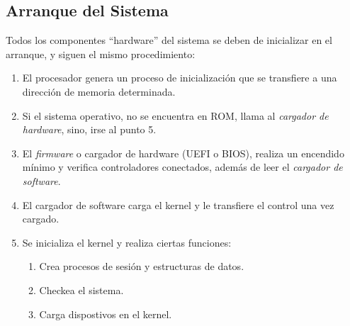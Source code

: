 \subsection{Arranque del Sistema}
Todos los componentes ``hardware'' del sistema se deben de inicializar en el arranque, y siguen el mismo procedimiento:
\begin{enumerate}
        \item El procesador genera un proceso de inicialización que se transfiere a una dirección de memoria determinada.
        \item Si el sistema operativo, no se encuentra en ROM, llama al \textit{cargador de hardware}, sino, irse al punto 5.
        \item El \textit{firmware} o cargador de hardware (UEFI o BIOS), realiza un encendido mínimo y verifica controladores conectados, además de leer el \textit{cargador de software}.
        \item El cargador de software carga el kernel y le transfiere el control una vez cargado.
        \item Se inicializa el kernel y realiza ciertas funciones:
              \begin{enumerate}
                      \item Crea procesos de sesión y estructuras de datos.
                      \item Checkea el sistema.
                      \item Carga dispostivos en el kernel.
              \end{enumerate}
\end{enumerate}
